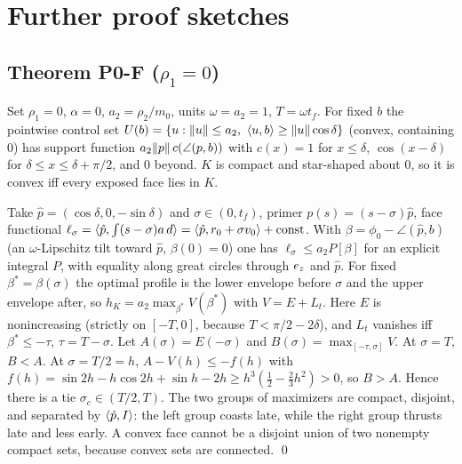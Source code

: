 \section{Further proof sketches}\label{app:other}

\subsection{Theorem P0-F ($\rho_1=0$)}
Set $\rho_1=0$, $\alpha=0$, $a_2=\rho_2/m_0$, units $\omega=a_2=1$, $T=\omega t_f$. For fixed $b$ the
pointwise control set $U(b)=\{u:\lVert u\rVert\le a_2,\ \langle u,b\rangle\ge\lVert u\rVert\cos\delta\}$ (convex, containing $0$) has support function
$a_2\lVert p\rVert\,c(\angle(p,b))$ with $c(x)=1$ for $x\le\delta$, $\cos(x-\delta)$ for $\delta\le x\le\delta+\pi/2$, and $0$ beyond. $K$ is compact and
star-shaped about $0$, so it is convex iff every exposed face lies in $K$.

Take $\hat p=(\cos\delta,0,-\sin\delta)$ and $\sigma\in(0,t_f)$, primer $p(s)=(s-\sigma)\hat p$, face functional
$\ell_\sigma=\langle \hat p,\int(s-\sigma)a\,d\rangle=\langle \hat p,r_0+\sigma v_0\rangle+\text{const}$. With $\beta=\phi_0-\angle(\hat p,b)$ (an $\omega$-Lipschitz tilt toward
$\hat p$, $\beta(0)=0$) one has $\ell_\sigma\le a_2P[\beta]$ for an explicit integral $P$, with equality along great circles through $e_z$ and
$\hat p$. For fixed $\beta^*=\beta(\sigma)$ the optimal profile is the lower envelope before $\sigma$ and the upper envelope after, so
$h_K=a_2\max_{\beta^*}V(\beta^*)$ with $V=E+L_t$. Here $E$ is nonincreasing (strictly on $[-T,0]$, because $T<\pi/2-2\delta$), and $L_t$ vanishes iff
$\beta^*\le-\tau$, $\tau=T-\sigma$. Let $A(\sigma)=E(-\sigma)$ and $B(\sigma)=\max_{[-\tau,\sigma]}V$. At $\sigma=T$, $B<A$. At $\sigma=T/2=h$,
$A-V(h)\le-f(h)$ with $f(h)=\sin2h-h\cos2h+\sin h-2h\ge h^3(\tfrac12-\tfrac23h^2)>0$, so $B>A$. Hence there is a tie $\sigma_c\in(T/2,T)$. The
two groups of maximizers are compact, disjoint, and separated by $\langle \hat p,I\rangle$: the left group coasts late, while the right group thrusts
late and less early. A convex face cannot be a disjoint union of two nonempty compact sets, because convex sets are connected. \qed

